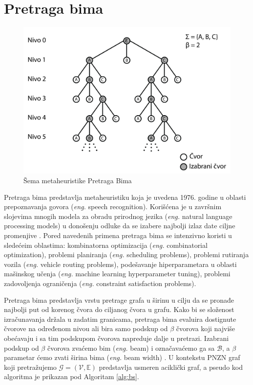 \documentclass[12pt,oneside]{memoir}
\begin{document}
\section{Pretraga bima}
\label{sec:pretragaBima}
\begin{figure}[!ht]
  \centering
  \includegraphics[width=1\textwidth]{Slike/bs1.png}
  \caption{Šema metaheuristike Pretraga Bima} 
  \label{fig:pretragaBima}
\end{figure}
Pretraga bima predstavlja metaheuristiku koja je uvedena 1976. godine u oblasti prepoznavanja govora
(\textit{eng.} speech recognition). Korišćena je u završnim slojevima mnogih modela za
obradu prirodnog jezika (\textit{eng.} natural language processing models) u donošenju odluke da se izabere najbolji
izlaz date ciljne promenjive \cite{BSIntroduction}. Pored navedenih primena pretraga bima se intenzivno koristi u sledećeim
oblastima: kombinatorna optimizacija (\textit{eng.} combinatorial optimization), problemi planiranja (\textit{eng.} scheduling problems),
problemi rutiranja vozila (\textit{eng.} vehicle routing problems), podešavanje hiperparametara u oblasti mašinskog učenja
(\textit{eng.} machine learning hyperparameter tuning), problemi zadovoljenja ograničenja (\textit{eng.} constraint satisfaction problems). 

Pretraga bima predstavlja vrstu pretrage grafa u širinu u cilju da
se pronađe najbolji put od korenog čvora do ciljanog čvora u grafu. Kako bi se složenost izračunavanja držala u
zadatim granicama, pretraga bima evaluira dostignute čvorove na određenom nivou ali bira samo podskup od $\beta$
čvorova koji najviše obećavaju i sa tim podskupom čvorova napreduje dalje u pretrazi. Izabrani podskup od $\beta$ čvorova
zvaćemo bim (\textit{eng.} beam) i označavaćemo ga sa $\mathcal{B}$, a $\beta$ parametar ćemo zvati širina bima (\textit{eng.} beam width) \cite{SCSBS}.
U kontekstu PNZN graf koji pretražujemo $\mathcal{G}=(\mathcal{V},\mathbb{E})$ predstavlja usmeren aciklički graf, 
a pseudo kod algoritma je prikazan pod Algoritam \ref{alg:bs}.
\end{document}
